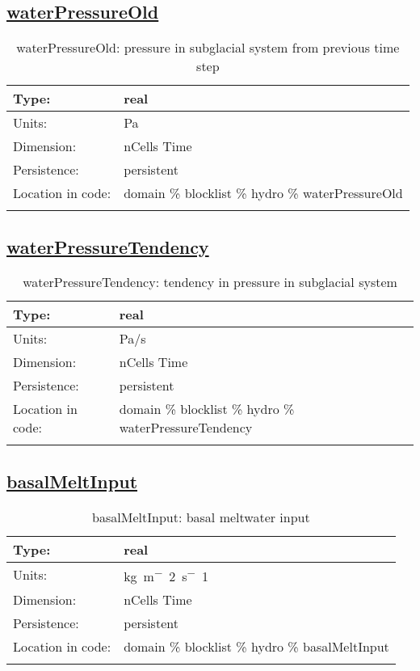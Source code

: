 \subsection[waterPressureOld]{\hyperref[sec:var_tab_hydro]{waterPressureOld}}
\label{subsec:var_sec_hydro_waterPressureOld}
\begin{center}
\begin{longtable}{| p{2.0in} | p{4.0in} |}
        \hline 
        Type: & real \\
        \hline 
        Units: & \si{Pa} \\
        \hline 
        Dimension: & nCells Time \\
        \hline 
        Persistence: & persistent \\
        \hline 
         Location in code: & domain \% blocklist \% hydro \% waterPressureOld \\
         \hline 
    \caption{waterPressureOld: pressure in subglacial system from previous time step}
\end{longtable}
\end{center}
\subsection[waterPressureTendency]{\hyperref[sec:var_tab_hydro]{waterPressureTendency}}
\label{subsec:var_sec_hydro_waterPressureTendency}
\begin{center}
\begin{longtable}{| p{2.0in} | p{4.0in} |}
        \hline 
        Type: & real \\
        \hline 
        Units: & \si{Pa/s} \\
        \hline 
        Dimension: & nCells Time \\
        \hline 
        Persistence: & persistent \\
        \hline 
         Location in code: & domain \% blocklist \% hydro \% waterPressureTendency \\
         \hline 
    \caption{waterPressureTendency: tendency in pressure in subglacial system}
\end{longtable}
\end{center}
\subsection[basalMeltInput]{\hyperref[sec:var_tab_hydro]{basalMeltInput}}
\label{subsec:var_sec_hydro_basalMeltInput}
\begin{center}
\begin{longtable}{| p{2.0in} | p{4.0in} |}
        \hline 
        Type: & real \\
        \hline 
        Units: & \si{kg.m^-2.s^-1} \\
        \hline 
        Dimension: & nCells Time \\
        \hline 
        Persistence: & persistent \\
        \hline 
         Location in code: & domain \% blocklist \% hydro \% basalMeltInput \\
         \hline 
    \caption{basalMeltInput: basal meltwater input}
\end{longtable}
\end{center}
